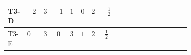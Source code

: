 \documentclass[8pt]{article}
\begin{document}
\begin{landscape}
\begin{longtable}{@{}llcccccc >{\raggedright\arraybackslash}p{0.21\linewidth} >{\raggedright\arraybackslash}p{0.21\linewidth}@{}}
\midrule
T3-D & $-2$ & $3$ & $-1$ & $1$ & $0$ & $2$ & $-\frac{1}{2}$ & \scriptsize\adjustbox{max width=\linewidth}{$\begin{gathered} 6 C_{5} Y_d Y_d^\dagger\end{gathered}$} & \scriptsize\adjustbox{max width=\linewidth}{$\begin{gathered} 6 C_{5} Y_u Y_u^\dagger\end{gathered}$} \\
\midrule
T3-E & $0$ & $3$ & $0$ & $3$ & $1$ & $2$ & $\frac{1}{2}$ & \scriptsize\adjustbox{max width=\linewidth}{$\begin{gathered} 6 C_{5} Y_d Y_d^\dagger\end{gathered}$} & \scriptsize\adjustbox{max width=\linewidth}{$\begin{gathered} 6 C_{5} Y_u Y_u^\dagger\end{gathered}$} \\
\midrule
\bottomrule
\end{longtable}
\end{landscape}
\end{document}
